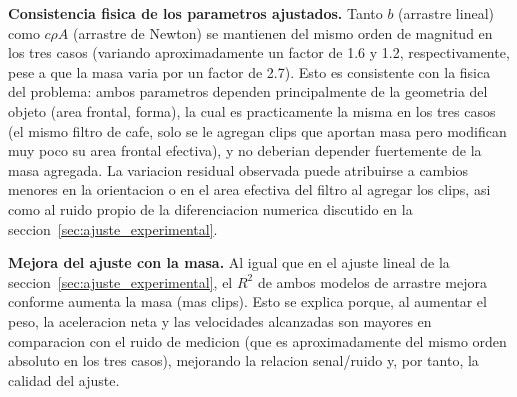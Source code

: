 \textbf{Consistencia fisica de los parametros ajustados.} Tanto $b$
(arrastre lineal) como $c\rho A$ (arrastre de Newton) se mantienen del mismo
orden de magnitud en los tres casos (variando aproximadamente un factor de
1.6 y 1.2, respectivamente, pese a que la masa varia por un factor de 2.7).
Esto es consistente con la fisica del problema: ambos parametros dependen
principalmente de la geometria del objeto (area frontal, forma), la cual es
practicamente la misma en los tres casos (el mismo filtro de cafe, solo se
le agregan clips que aportan masa pero modifican muy poco su area frontal
efectiva), y no deberian depender fuertemente de la masa agregada. La
variacion residual observada puede atribuirse a cambios menores en la
orientacion o en el area efectiva del filtro al agregar los clips, asi como
al ruido propio de la diferenciacion numerica discutido en la
seccion~\ref{sec:ajuste_experimental}.

\textbf{Mejora del ajuste con la masa.} Al igual que en el ajuste lineal de
la seccion~\ref{sec:ajuste_experimental}, el $R^2$ de ambos modelos de
arrastre mejora conforme aumenta la masa (mas clips). Esto se explica porque,
al aumentar el peso, la aceleracion neta y las velocidades alcanzadas son
mayores en comparacion con el ruido de medicion (que es aproximadamente del
mismo orden absoluto en los tres casos), mejorando la relacion senal/ruido y,
por tanto, la calidad del ajuste.
